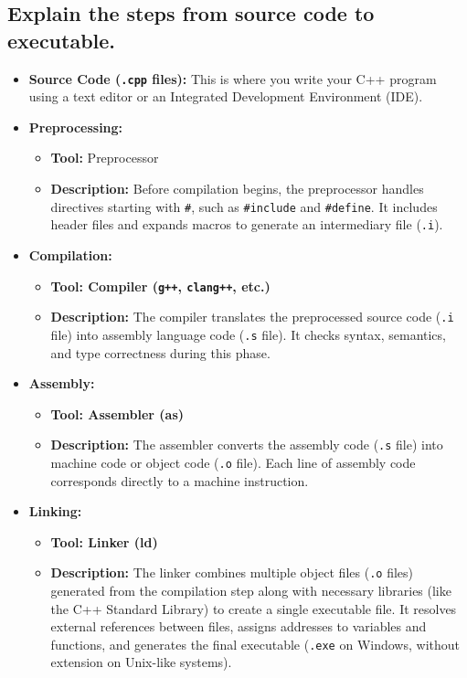 \subsection{Explain the steps from source code to executable.}
\begin{itemize}
    \item \textbf{Source Code (\texttt{.cpp} files):} This is where you write your C++ program using a text editor or an Integrated Development Environment (IDE).
    \item \textbf{Preprocessing:}
    \begin{itemize}
        \item \textbf{Tool:} Preprocessor
        \item \textbf{Description:} Before compilation begins, the preprocessor handles directives starting with \texttt{\#}, such as \texttt{\#include} and \texttt{\#define}. It includes header files and expands macros to generate an intermediary file (\texttt{.i}).
    \end{itemize}
    \item \textbf{Compilation:}
    \begin{itemize}
        \item \textbf{Tool: Compiler (\texttt{g++}, \texttt{clang++}, etc.)}
        \item \textbf{Description:} The compiler translates the preprocessed source code (\texttt{.i} file) into assembly language code (\texttt{.s} file). It checks syntax, semantics, and type correctness during this phase.
    \end{itemize}
    \item \textbf{Assembly:}
    \begin{itemize}
        \item \textbf{Tool: Assembler (as)}
        \item \textbf{Description:} The assembler converts the assembly code (\texttt{.s} file) into machine code or object code (\texttt{.o} file). Each line of assembly code corresponds directly to a machine instruction.
    \end{itemize}
    \item \textbf{Linking:}
    \begin{itemize}
        \item \textbf{Tool: Linker (ld)}
        \item \textbf{Description:} The linker combines multiple object files (\texttt{.o} files) generated from the compilation step along with necessary libraries (like the C++ Standard Library) to create a single executable file. It resolves external references between files, assigns addresses to variables and functions, and generates the final executable (\texttt{.exe} on Windows, without extension on Unix-like systems).

\end{itemize}
\end{itemize}
